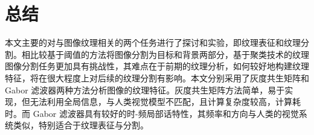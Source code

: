 \section{总结}
本文主要的对与图像纹理相关的两个任务进行了探讨和实验，即纹理表征和纹理分割。相比较基于阈值的方法将图像分割为目标和背景两部分，基于聚类技术的纹理图像分割任务更加具有挑战性，其难点在于前期的纹理分析，如何较好地构建纹理特征，将在很大程度上对后续的纹理分割有影响。本文分别采用了灰度共生矩阵和 Gabor 滤波器两种方法分析图像的纹理特征。灰度共生矩阵方法简单，易于实现，但无法利用全局信息，与人类视觉模型不匹配，且计算复杂度较高，计算耗时。而 Gabor 滤波器具有较好的时-频局部话特性，其频率和方向与人类的视觉系统类似，特别适合于纹理表征与分割。
